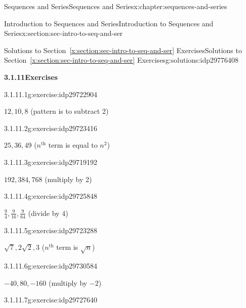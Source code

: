 \documentclass[twoside,10pt,]{book}
\newcommand{\xreffont}{\relax}
\numberwithin{equation}{section}
\newcommand{\nth}{{n^{\text{th}}}}
\begin{document}
\begin{chapterptx}{Sequences and Series}{}{Sequences and Series}{}{}{x:chapter:sequences-and-series}
\begin{sectionptx}{Introduction to Sequences and Series}{}{Introduction to Sequences and Series}{}{}{x:section:sec-intro-to-seq-and-ser}
\typeout{************************************************}
%
\begin{solutions-subsection}{Solutions to Section~{\xreffont\ref*{x:section:sec-intro-to-seq-and-ser}} Exercises}{}{Solutions to Section~{\xreffont\ref*{x:section:sec-intro-to-seq-and-ser}} Exercises}{}{}{g:solutions:idp29776408}
\par\medskip
\noindent\textbf{\normalsize{}3.1.11\space\textperiodcentered\space{}Exercises}
\begin{exercisegroup}
\begin{divisionsolutioneg}{3.1.11.1}{}{g:exercise:idp29722904}%
\par\smallskip%
\noindent\hypertarget{g:solution:idp29722392-main}{}\(12, 10, 8\) (pattern is to subtract 2)\end{divisionsolutioneg}%
\begin{divisionsolutioneg}{3.1.11.2}{}{g:exercise:idp29723416}%
\par\smallskip%
\noindent\hypertarget{g:solution:idp29724952-main}{}\(25, 36, 49\) (\(\nth{}\) term is equal to \(n^2\))\end{divisionsolutioneg}%
\begin{divisionsolutioneg}{3.1.11.3}{}{g:exercise:idp29719192}%
\par\smallskip%
\noindent\hypertarget{g:solution:idp29725720-main}{}\(192, 384, 768\) (multiply by 2)\end{divisionsolutioneg}%
\begin{divisionsolutioneg}{3.1.11.4}{}{g:exercise:idp29725848}%
\par\smallskip%
\noindent\hypertarget{g:solution:idp29722520-main}{}\(\frac{9}{4},\frac{9}{{16}},\frac{9}{{64}}\) (divide by 4)\end{divisionsolutioneg}%
\begin{divisionsolutioneg}{3.1.11.5}{}{g:exercise:idp29723288}%
\par\smallskip%
\noindent\hypertarget{g:solution:idp29719576-main}{}\(\sqrt 7 ,2\sqrt 2 ,3\) (\(\nth{}\) term is \(\sqrt{n}\))\end{divisionsolutioneg}%
\begin{divisionsolutioneg}{3.1.11.6}{}{g:exercise:idp29730584}%
\par\smallskip%
\noindent\hypertarget{g:solution:idp29732120-main}{}\(-40, 80, -160\) (multiply by \(-2\))\end{divisionsolutioneg}%
\begin{divisionsolutioneg}{3.1.11.7}{}{g:exercise:idp29727640}%
\par\smallskip%

\end{divisionsolutioneg}
\end{exercisegroup}
\end{solutions-subsection}
\end{sectionptx}
\end{chapterptx}
\end{document}
